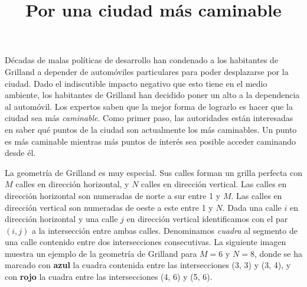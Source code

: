 \documentclass{oci}
\title{Por una ciudad más caminable}
\begin{document}
\begin{problemDescription}
  Décadas de malas políticas de desarrollo han condenado a los habitantes de Grilland a depender
  de automóviles particulares para poder desplazarse por la ciudad.
  Dado el indiscutible impacto negativo que esto tiene en el medio ambiente, los habitantes de
  Grilland han decidido poner un alto a la dependencia al automóvil.
  Los expertos saben que la mejor forma de lograrlo es hacer que la ciudad sea más
  \emph{caminable}.
  Como primer paso, las autoridades están interesadas en saber qué puntos de la ciudad son
  actualmente los más caminables.
  Un punto es más caminable mientras más puntos de interés sea posible acceder caminando
  desde él.

  La geometría de Grilland es muy especial.
  Sus calles forman un grilla perfecta con $M$ calles en dirección horizontal,
  y $N$ calles en dirección vertical.
  Las calles en dirección horizontal son numeradas de norte a sur entre 1 y $M$.
  Las calles en dirección vertical son numeradas de oeste a este entre 1 y $N$.
  Dada una calle $i$ en dirección horizontal y una calle $j$ en dirección vertical identificamos
  con el par $(i, j)$ a la intersección entre ambas calles.
  Denominamos \emph{cuadra} al segmento de una calle contenido entre dos intersecciones consecutivas.
  La siguiente imagen muestra un ejemplo de la geometría de Grilland para $M=6$ y $N=8$, donde se
  ha marcado con {\bf\color{blue}azul} la cuadra contenida entre las intersecciones (3, 3) y (3, 4),
   y con {\bf\color{red}rojo} la cuadra entre las intersecciones (4, 6) y (5, 6).


  \begin{center}
  \end{center}


\end{problemDescription}
\end{document}
